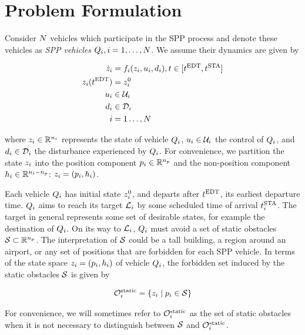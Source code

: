 \section{Problem Formulation \label{sec:formulation}}
Consider $N$ vehicles which participate in the SPP process and denote these vehicles as \textit{SPP vehicles} $Q_{i}, i = 1, \ldots, N$. We assume their dynamics are given by

\begin{equation}
\label{eq:dyn}
\begin{aligned}
\dot\state_i &= \fdyn_i(\state_i, \ctrl_i, \dstb_i), t \in [\edt, \sta] \\
\state_i(\edt) &= \state^0_i \\
\ctrl_i &\in \cset_i \\
\dstb_i &\in \dset_i \\
i &= 1 \ldots, \N
\end{aligned}
\end{equation}

\noindent where $z_i \in \mathbb{R}^{n_i}$ represents the state of vehicle $Q_{i}$, $u_i \in \mathcal{U}_i$ the control of $Q_{i}$, and $d_i \in \mathcal{D}_i$ the disturbance experienced by $Q_{i}$. For convenience, we partition the state $z_i$ into the position component $p_i \in \mathbb{R}^{n_p}$ and the non-position component $h_i \in \mathbb{R}^{n_i - n_p}$: $z_i = (p_i, h_i)$.

Each vehicle $Q_{i}$ has initial state $z^0_i$, and departs after $t^\text{EDT}$, its earliest departure time. $Q_{i}$ aims to reach its target $\mathcal{L}_i$ by some scheduled time of arrival $t^\text{STA}_i$. The target in general represents some set of desirable states, for example the destination of $Q_{i}$. On its way to $\mathcal{L}_i$, $Q_{i}$ must avoid a set of static obstacles $\mathcal{S} \subset \mathbb{R}^{n_p}$. The interpretation of $\mathcal{S}$ could be a tall building, a region around an airport, or any set of positions that are forbidden for each SPP vehicle. In terms of the state space $z_i = (p_i, h_i)$ of vehicle $Q_{i}$, the forbidden set induced by the static obstacles $\mathcal{S}$ is given by

\begin{equation}
\begin{aligned}
\mathcal{O}^\text{static}_i = \{z_i \mid p_i \in \mathcal{S}\}
\end{aligned}
\end{equation}

For convenience, we will sometimes refer to $\mathcal{O}^\text{static}_i$ as the set of static obstacles when it is not necessary to distinguish between $\mathcal{S}$ and $\mathcal{O}^\text{static}_i$.


